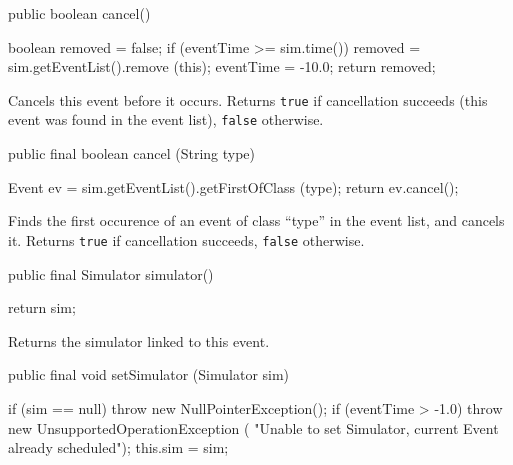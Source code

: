 \begin{code}

   public boolean cancel() \begin{hide} {
      boolean removed = false;
      if (eventTime >= sim.time()) removed = sim.getEventList().remove (this);
      eventTime = -10.0;
      return removed;
   } \end{hide}
\end{code}
  \begin{tabb}  Cancels this event before it occurs.
   Returns \texttt{true} if cancellation succeeds (this event was found
   in the event list), \texttt{false} otherwise.
  \end{tabb}
\begin{htmlonly}
\end{htmlonly}
\begin{code}

   public final boolean cancel (String type) \begin{hide} {
      Event ev = sim.getEventList().getFirstOfClass (type);
      return ev.cancel();
   } \end{hide}
\end{code}
  \begin{tabb}  Finds the first occurence of an event of class ``type''
    in the event list, and cancels it.
    Returns \texttt{true} if cancellation succeeds, \texttt{false} otherwise.
  \end{tabb}
\begin{htmlonly}
\end{htmlonly}
\begin{code}

   public final Simulator simulator() \begin{hide} {
      return sim;
   } \end{hide}
\end{code}
  \begin{tabb}  Returns the simulator linked to this event.
  \end{tabb}
\begin{htmlonly}
\end{htmlonly}
\begin{code}

   public final void setSimulator (Simulator sim) \begin{hide} {
      if (sim == null)
          throw new NullPointerException();
      if (eventTime > -1.0)
         throw new UnsupportedOperationException (
            "Unable to set Simulator, current Event already scheduled");
      this.sim = sim;
   } \end{hide}
\end{code}
